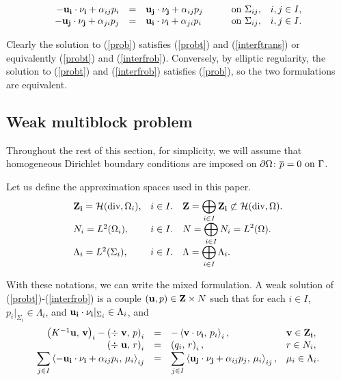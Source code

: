 \begin{equation}\label{interfrob}\begin{array}{rllll}
- {\bf u_i \cdot \nu_i}  + \alpha_{ij} p_i 
&=& 
{\bf u_j \cdot  \nu_j} + \alpha_{ij} p_j 
&\qquad\mbox{on }\Sigma_{ij},&i,j \in I,\\
- {\bf u_j \cdot  \nu_j} + \alpha_{ji} p_j 
&=& 
{\bf u_i \cdot  \nu_i}  + \alpha_{ji} p_i 
&\qquad\mbox{on }\Sigma_{ij},&i,j \in I.\\
\end{array}\end{equation}

Clearly the solution to (\ref{prob}) satisfies (\ref{probt}) and (\ref{interftrans}) or 
equivalently (\ref{probt}) and (\ref{interfrob}). Conversely, by elliptic regularity,
the solution to (\ref{probt}) and (\ref{interfrob}) satisfies (\ref{prob}), so the two 
formulations are equivalent.

\subsection{Weak multiblock problem}
Throughout the rest of this section, for simplicity, we will assume that
homogeneous Dirichlet boundary conditions are imposed on $\partial \Omega$: 
$\overline{p} = 0 \mbox{ on }\Gamma$.

Let us define the approximation spaces used in this paper.
\begin{equation}\begin{array}{lll}
  {\bf Z_i} = {\cal H}(\mbox{div},\Omega_i),&i \in I. & 
{\bf Z} = \displaystyle \bigoplus_{i \in I}  {\bf  Z_i} \not \subset {\cal H}(\mbox{div},\Omega) . \\
  N_i = L^2(\Omega_i),&i \in I. & N = \displaystyle \bigoplus_{i \in I} N_i =  L^2(\Omega). \\
  \Lambda_i = L^2(\Sigma_i),&i \in I. & \Lambda = \displaystyle \bigoplus_{i \in I} \Lambda_i. \\
\end{array}\end{equation}

With these notations, we can write the mixed formulation. A weak solution 
of (\ref{probt})-(\ref{interfrob}) 
is a couple $({\bf u}, p) \in  {\bf Z} \times N$ such that for each 
$i \in I$, $p_i|_{\Sigma_i} \in \Lambda_i$, and
${\bf u_i \cdot \nu_i}|_{\Sigma_i}  \in \Lambda_i$, and 
 \begin{equation}\label{probtw}\begin{array}{rcll}
\left( K^{-1}{\bf u},\, {\bf v} \right)_{i} - 
\left( \div\; {\bf v}, \, p \right)_{i}  & = & \displaystyle 
- \left< {\bf v \cdot  \nu_i} , \, p_{i} \right>_{i},  & {\bf v} \in {\bf Z_{i}}, \\
\left( \div\; {\bf u}, \, r \right)_{i} &= &
 \left(q_i, \, r \right)_{i},  & r \in N_{i},\\
\displaystyle \sum_{j \in I} \left< - {\bf u_{i} \cdot  \nu_i}  + \alpha_{ij} p_i  , 
\, \mu_{i} \right>_{ij} & = & 
\displaystyle \sum_{j \in I} \left< {\bf u_{j} \cdot  \nu_j}  + \alpha_{ij} p_j  , 
\, \mu_{i} \right>_{ij},  & \mu_{i} \in \Lambda_{i}.\\
\end{array}\end{equation}

